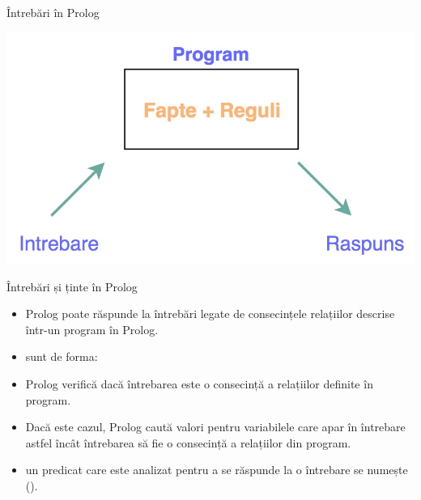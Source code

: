 \documentclass[xcolor=x11names,compress,10pt]{beamer}
\begin{document}
\begin{frame}{\^Intrebări în Prolog}

\begin{center}
\includegraphics[scale=.3]{img/Prolog}
\end{center}

\end{frame}


\begin{frame}{\^Intrebări și ținte în Prolog}

\begin{itemize}
	\item Prolog poate răspunde la întrebări legate de consecințele relațiilor descrise într-un program în Prolog.
	\smallskip
	\item {} sunt de forma:
	\begin{center}
	\end{center}
	\smallskip
	\item Prolog verifică dacă întrebarea este o consecință a relațiilor definite în program.
	\smallskip
	\item Dacă este cazul, Prolog caută valori pentru variabilele care apar în întrebare astfel încât întrebarea să fie o consecință a relațiilor din program.
\smallskip	
	\item un predicat care este analizat pentru a se răspunde la o întrebare se numește  ().
\end{itemize}
\end{frame}
\end{document}
